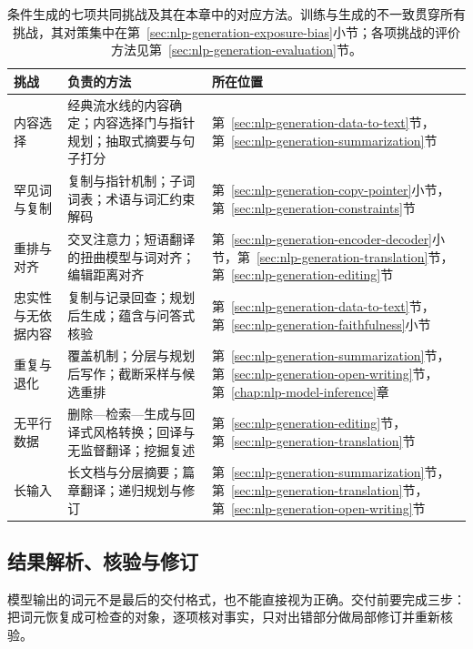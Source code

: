 \begin{table}[htbp]
  \centering
  \small
  \begin{tabularx}{\linewidth}{@{}>{\raggedright\arraybackslash}p{24mm}
    >{\raggedright\arraybackslash}X>{\raggedright\arraybackslash}p{40mm}@{}}
    \toprule
    挑战 & 负责的方法 & 所在位置 \\
    \midrule
    内容选择 & 经典流水线的内容确定；内容选择门与指针规划；抽取式摘要与句子打分 & 第~\ref{sec:nlp-generation-data-to-text}节，第~\ref{sec:nlp-generation-summarization}节 \\
    罕见词与复制 & 复制与指针机制；子词词表；术语与词汇约束解码 & 第~\ref{sec:nlp-generation-copy-pointer}小节，第~\ref{sec:nlp-generation-constraints}节 \\
    重排与对齐 & 交叉注意力；短语翻译的扭曲模型与词对齐；编辑距离对齐 & 第~\ref{sec:nlp-generation-encoder-decoder}小节，第~\ref{sec:nlp-generation-translation}节，第~\ref{sec:nlp-generation-editing}节 \\
    忠实性与无依据内容 & 复制与记录回查；规划后生成；蕴含与问答式核验 & 第~\ref{sec:nlp-generation-data-to-text}节，第~\ref{sec:nlp-generation-faithfulness}小节 \\
    重复与退化 & 覆盖机制；分层与规划后写作；截断采样与候选重排 & 第~\ref{sec:nlp-generation-summarization}节，第~\ref{sec:nlp-generation-open-writing}节，第~\ref{chap:nlp-model-inference}章 \\
    无平行数据 & 删除—检索—生成与回译式风格转换；回译与无监督翻译；挖掘复述 & 第~\ref{sec:nlp-generation-editing}节，第~\ref{sec:nlp-generation-translation}节 \\
    长输入 & 长文档与分层摘要；篇章翻译；递归规划与修订 & 第~\ref{sec:nlp-generation-summarization}节，第~\ref{sec:nlp-generation-translation}节，第~\ref{sec:nlp-generation-open-writing}节 \\
    \bottomrule
  \end{tabularx}
  \caption{条件生成的七项共同挑战及其在本章中的对应方法。训练与生成的不一致贯穿所有挑战，其对策集中在第~\ref{sec:nlp-generation-exposure-bias}小节；各项挑战的评价方法见第~\ref{sec:nlp-generation-evaluation}节。}
  \label{tab:nlp-generation-challenges}
\end{table}

\subsection{结果解析、核验与修订}
\label{sec:nlp-generation-recovery}

模型输出的词元不是最后的交付格式，也不能直接视为正确。交付前要完成三步：把词元恢复成可检查的对象，逐项核对事实，只对出错部分做局部修订并重新核验。


